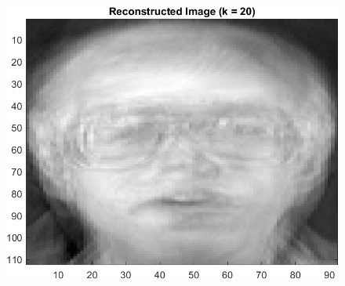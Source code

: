 \documentclass{article}
\begin{document}
\begin{figure}[!htb]
    \begin{minipage}[b]{0.3\textwidth}
        \includegraphics[width=\textwidth]{orl_recon_20.png}
    \end{minipage}
\end{figure}
\end{document}
